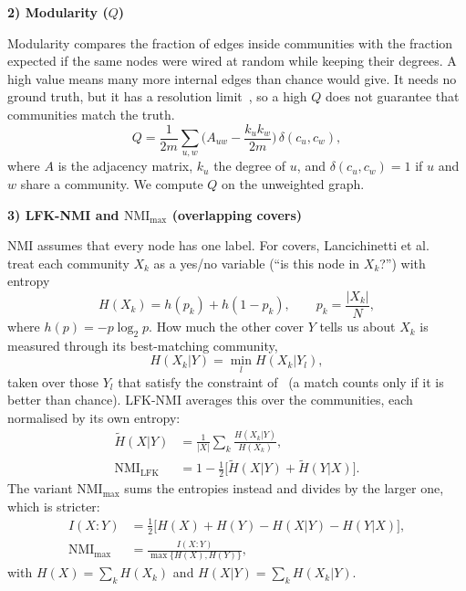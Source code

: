 \documentclass[conference]{IEEEtran}
\newcommand{\metrichead}[1]{\par\smallskip\noindent\textbf{#1}\par\nobreak\vspace{1pt}}
\begin{document}
\metrichead{2) Modularity ($Q$)}
Modularity compares the fraction of edges inside communities with the fraction expected if the same nodes were wired at random while keeping their degrees. A high value means many more internal edges than chance would give. It needs no ground truth, but it has a resolution limit~\cite{fortunato2007}, so a high $Q$ does not guarantee that communities match the truth.
\begin{equation}
Q=\frac1{2m}\sum_{u,w}\Big(A_{uw}-\frac{k_uk_w}{2m}\Big)\,\delta(c_u,c_w),\label{eq:Q}
\end{equation}
where $A$ is the adjacency matrix, $k_u$ the degree of $u$, and $\delta(c_u,c_w)=1$ if $u$ and $w$ share a community. We compute $Q$ on the unweighted graph.

\metrichead{3) LFK-NMI and $\mathrm{NMI}_{\max}$ (overlapping covers)}
NMI assumes that every node has one label. For covers, Lancichinetti et al.~\cite{lfk2009} treat each community $X_k$ as a yes/no variable (``is this node in $X_k$?'') with entropy
\begin{equation}
H(X_k)=h(p_k)+h(1-p_k),\qquad p_k=\frac{|X_k|}{N},
\end{equation}
where $h(p)=-p\log_2p$.
How much the other cover $Y$ tells us about $X_k$ is measured through its best-matching community,
\begin{equation}
H(X_k|Y)=\min_lH(X_k|Y_l),
\end{equation}
taken over those $Y_l$ that satisfy the constraint of~\cite{lfk2009} (a match counts only if it is better than chance). LFK-NMI averages this over the communities, each normalised by its own entropy:
\begin{align}
\tilde H(X|Y)&=\frac1{|X|}\sum_k\frac{H(X_k|Y)}{H(X_k)},\label{eq:lfk1}\\
\mathrm{NMI}_{\mathrm{LFK}}&=1-\tfrac12\big[\tilde H(X|Y)+\tilde H(Y|X)\big].\label{eq:lfk}
\end{align}
The variant $\mathrm{NMI}_{\max}$ sums the entropies instead and divides by the larger one, which is stricter:
\begin{align}
I(X\!:\!Y)&=\tfrac12\big[H(X)+H(Y)-H(X|Y)-H(Y|X)\big],\\
\mathrm{NMI}_{\max}&=\frac{I(X\!:\!Y)}{\max\{H(X),H(Y)\}},
\end{align}
with $H(X)=\sum_kH(X_k)$ and $H(X|Y)=\sum_kH(X_k|Y)$.
\end{document}
